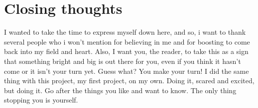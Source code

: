 \documentclass{report}
\begin{document}
\section{Closing thoughts}
I wanted to take the time to express myself down here, and so, i want to thank several people who i won't mention for believing in me and for boosting to come back into my field and heart. Also, I want you, the reader, to take this as a sign that something bright and big is out there for you, even if you think it hasn't come or it isn't your turn yet. Guess what? You make your turn! I did the same thing with this project, my first project, on my own. Doing it, scared and excited, but doing it. Go after the things you like and want to know. The only thing stopping you is yourself.

\printbibliography[title=Citations]
\end{document}
